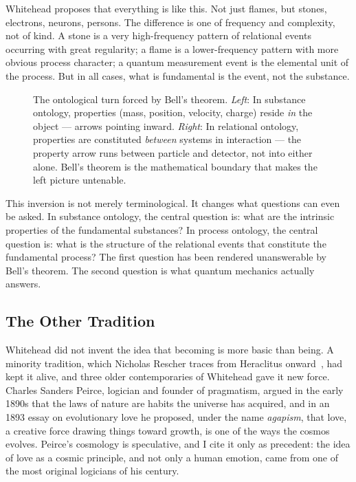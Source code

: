 Whitehead proposes that everything is like this. Not just flames, but stones, electrons, neurons, persons. The difference is one of frequency and complexity, not of kind. A stone is a very high-frequency pattern of relational events occurring with great regularity; a flame is a lower-frequency pattern with more obvious process character; a quantum measurement event is the elemental unit of the process. But in all cases, what is fundamental is the event, not the substance.

\begin{figure}[htbp]
  \centering
  \resizebox{\linewidth}{!}{}
  \caption[From substance to relational ontology]{The ontological turn forced by Bell's theorem. \emph{Left}: In substance ontology, properties (mass, position, velocity, charge) reside \emph{in} the object --- arrows pointing inward. \emph{Right}: In relational ontology, properties are constituted \emph{between} systems in interaction --- the property arrow runs between particle and detector, not into either alone. Bell's theorem is the mathematical boundary that makes the left picture untenable.}
  \label{fig:ontological-turn}
\end{figure}

This inversion is not merely terminological. It changes what questions can even be asked. In substance ontology, the central question is: what are the intrinsic properties of the fundamental substances? In process ontology, the central question is: what is the structure of the relational events that constitute the fundamental process? The first question has been rendered unanswerable by Bell's theorem. The second question is what quantum mechanics actually answers.

\subsection*{The Other Tradition}

Whitehead did not invent the idea that becoming is more basic than being. A minority tradition, which Nicholas Rescher traces from Heraclitus onward~\citep{Rescher1996}, had kept it alive, and three older contemporaries of Whitehead gave it new force. Charles Sanders Peirce, logician and founder of pragmatism, argued in the early 1890s that the laws of nature are habits the universe has acquired, and in an 1893 essay on evolutionary love he proposed, under the name \emph{agapism}, that love, a creative force drawing things toward growth, is one of the ways the cosmos evolves. Peirce's cosmology is speculative, and I cite it only as precedent: the idea of love as a cosmic principle, and not only a human emotion, came from one of the most original logicians of his century.

